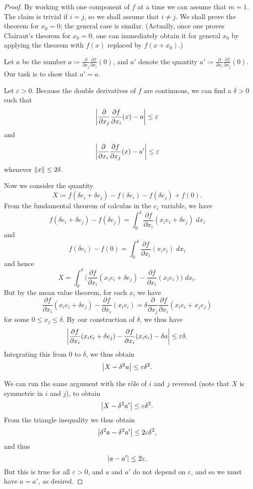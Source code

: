 \begin{proof}
  By working with one component of \(f\) at a time we can assume that \(m = 1\).
  The claim is trivial if \(i = j\), so we shall assume that \(i \neq j\).
  We shall prove the theorem for \(x_0 = 0\);
  the general case is similar.
  (Actually, once one proves Clairaut's theorem for \(x_0 = 0\), one can immediately obtain it for general \(x_0\) by applying the theorem with \(f(x)\) replaced by \(f(x + x_0)\).)

  Let \(a\) be the number \(a \coloneqq \frac{\partial}{\partial x_j} \frac{\partial f}{\partial x_i}(0)\), and \(a'\) denote the quantity \(a' \coloneqq \frac{\partial}{\partial x_i} \frac{\partial f}{\partial x_j}(0)\).
  Our task is to show that \(a' = a\).

  Let \(\varepsilon > 0\).
  Because the double derivatives of \(f\) are continuous, we can find a \(\delta > 0\) such that
  \[
    \abs{\frac{\partial}{\partial x_j} \frac{\partial f}{\partial x_i}(x) - a} \leq \varepsilon
  \]
  and
  \[
    \abs{\frac{\partial}{\partial x_i} \frac{\partial f}{\partial x_j}(x) - a'} \leq \varepsilon
  \]
  whenever \(\norm*{x} \leq 2\delta\).

  Now we consider the quantity
  \[
    X \coloneqq f(\delta e_i + \delta e_j) - f(\delta e_i) - f(\delta e_j) + f(0).
  \]
  From the fundamental theorem of calculus in the \(e_i\) variable, we have
  \[
    f(\delta e_i + \delta e_j) - f(\delta e_j) = \int_0^{\delta} \frac{\partial f}{\partial x_i}(x_i e_i + \delta e_j) \; d x_i
  \]
  and
  \[
    f(\delta e_i) - f(0) = \int_0^{\delta} \frac{\partial f}{\partial x_i}(x_i e_i) \; d x_i
  \]
  and hence
  \[
    X = \int_0^{\delta} \bigg(\frac{\partial f}{\partial x_i} (x_i e_i + \delta e_j) - \frac{\partial f}{\partial x_i} (x_i e_i)\bigg) \; d x_i.
  \]
  But by the mean value theorem, for each \(x_i\) we have
  \[
    \frac{\partial f}{\partial x_i} (x_i e_i + \delta e_j) - \frac{\partial f}{\partial x_i} (x_i e_i) = \delta \frac{\partial}{\partial x_j} \frac{\partial f}{\partial x_i} (x_i e_i + x_j e_j)
  \]
  for some \(0 \leq x_j \leq \delta\).
  By our construction of \(\delta\), we thus have
  \[
    \abs{\frac{\partial f}{\partial x_i} (x_i e_i + \delta e_j) - \frac{\partial f}{\partial x_i} (x_i e_i) - \delta a} \leq \varepsilon \delta.
  \]
  Integrating this from \(0\) to \(\delta\), we thus obtain
  \[
    \abs{X - \delta^2 a} \leq \varepsilon \delta^2.
  \]

  We can run the same argument with the rôle of \(i\) and \(j\) reversed (note that \(X\) is symmetric in \(i\) and \(j\)), to obtain
  \[
    \abs{X - \delta^2 a'} \leq \varepsilon \delta^2.
  \]
  From the triangle inequality we thus obtain
  \[
    \abs{\delta^2 a - \delta^2 a'} \leq 2 \varepsilon \delta^2,
  \]
  and thus
  \[
    \abs{a - a'} \leq 2 \varepsilon.
  \]
  But this is true for all \(\varepsilon > 0\), and \(a\) and \(a'\) do not depend on \(\varepsilon\), and so we must have \(a = a'\), as desired.
\end{proof}

